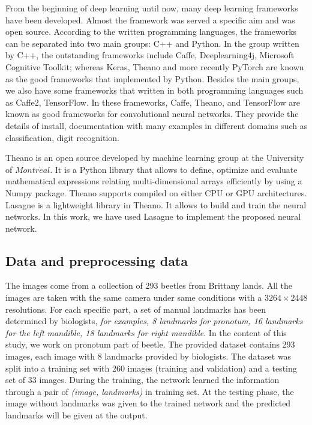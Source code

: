 \documentclass[conference]{IEEEtran}
\begin{document}
From the beginning of deep learning until now, many deep learning frameworks have been developed. Almost the framework was served a specific aim and was open source. According to the written programming languages, the frameworks can be separated into two main groups: C++ and Python. In the group written by C++, the outstanding frameworks include Caffe\cite{jia2014caffe}, Deeplearning4j, Microsoft Cognitive Toolkit\cite{yu2014introduction}; whereas Keras\cite{chollet2015keras}, Theano\cite{2016arXiv160502688short} and more recently PyTorch\cite{} are known as the good frameworks that implemented by Python. Besides the main groups, we also have some frameworks that written in both programming languages such as Caffe2\cite{jia2014caffe}, TensorFlow\cite{abadi2016tensorflow}. In these frameworks, Caffe, Theano, and TensorFlow are known as good frameworks for convolutional neural networks. They provide the details of install, documentation with many examples in different domains such as classification, digit recognition.

Theano is an open source developed by machine learning group at the University of $Montr\acute{e}al$. It is a Python library that allows to define, optimize and evaluate mathematical expressions relating multi-dimensional arrays efficiently by using a Numpy package. Theano supports compiled on either CPU or GPU architectures. Lasagne\cite{lasagne} is a lightweight library in Theano. It allows to build and train the neural networks. In this work, we have used Lasagne to implement the proposed neural network.
\subsection{Data and preprocessing data}
The images come from a collection of 293 beetles from Brittany lands. All the images are taken with the same camera under same conditions with a $3264 \times 2448$ resolutions. For each specific part, a set of manual landmarks has been determined by biologists, \textit{for examples, 8 landmarks for pronotum, 16 landmarks for the left mandible, 18 landmarks for right mandible}. In the content of this study, we work on pronotum part of beetle. The provided dataset contains 293 images, each image with 8 landmarks provided by biologists. The dataset was split into a training set with 260 images (training and validation) and a testing set of 33 images. During the training, the network learned the information through a pair of \textit{(image, landmarks)} in training set. At the testing phase, the image without landmarks was given to the trained network and the predicted landmarks will be given at the output.
\end{document}
